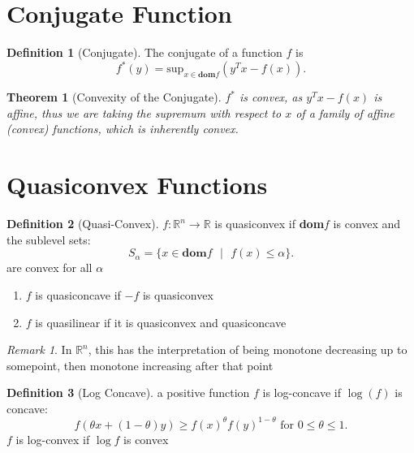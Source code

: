 \documentclass{report}
\newtheorem{theorem}{Theorem}[section]
\theoremstyle{remark} \newtheorem{remark}{Remark}[section]
\theoremstyle{definition}
\newtheorem{definition}{Definition}[section]
\theoremstyle{definition}
\theoremstyle{definition}
\theoremstyle{remark}
\begin{document}
\section{Conjugate Function}

\begin{definition}[Conjugate]
    The conjugate of a function $f$ is
    \[
    f^{*}(y) = \text{sup}_{x\in\textbf{dom}f}(y^{T}x-f(x))
    .\] 
       
\end{definition}


\begin{theorem}[Convexity of the Conjugate]
    $f^{*}$ is convex, as $y^{T}x - f(x)$ is affine, thus we are taking the supremum with respect to $x$ of a family of affine (convex) functions, which is inherently convex.
       
\end{theorem}

\section{Quasiconvex Functions}

\begin{definition}[Quasi-Convex]
    $f:\mathbb{R}^{n}\to \mathbb{R}$ is quasiconvex if \textbf{dom}$f$ is convex and the sublevel sets:
    \[
    S_\alpha = \{x\in\textbf{dom}f \text{ }|\text{ }f(x)\le \alpha\}
    .\] are convex for all $\alpha$
      \begin{enumerate}
          \item $f$ is quasiconcave if $-f$ is quasiconvex
              \item $f$ is quasilinear if it is quasiconvex and quasiconcave
      \end{enumerate} 
\end{definition}

\begin{remark}
    In $\mathbb{R}^{n}$, this has the interpretation of being monotone decreasing up to somepoint, then monotone increasing after that point   
\end{remark}

\begin{definition}[Log Concave]
    a positive function $f$ is log-concave if $\log(f)$ is concave:
    \[
    f(\theta x+(1-\theta)y) \ge f(x)^{\theta}f(y)^{1-\theta} \text{ for }0\le \theta\le 1
    .\] 
    $f$ is log-convex if $\log f$ is convex
       
\end{definition}
\end{document}
